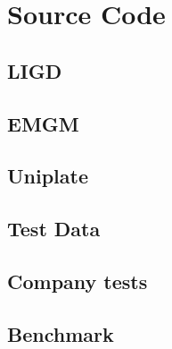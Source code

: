 \documentclass[abstracton,parskip=half]{scrreprt}
\begin{document}
    
    

    \appendix{}
    \chapter{Source Code}

    \lstset{frame=none}
    \section{LIGD}
    
    \section{EMGM}
    
    \section{Uniplate}
    
    \section{Test Data}
    
    \section{Company tests}
    

    \section{Benchmark}
    
\end{document}
